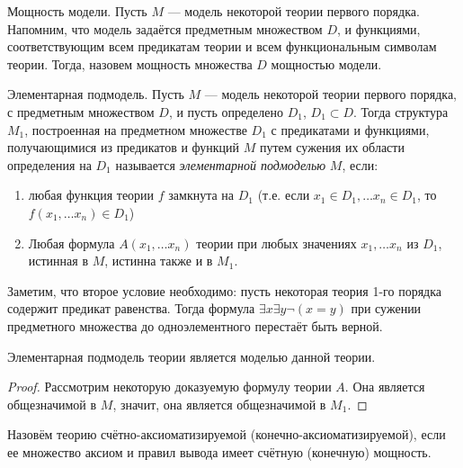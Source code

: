 \begin{definition}{Мощность модели.}
Пусть $M$ --- модель некоторой теории первого порядка. Напомним, что модель
задаётся предметным множеством $D$, и функциями, соответствующим всем
предикатам теории и всем функциональным символам теории. Тогда, назовем
мощность множества $D$ мощностью модели.
\end{definition}

\begin{definition}{Элементарная подмодель.}
Пусть $M$ --- модель некоторой теории первого порядка, с предметным
множеством $D$, и пусть определено $D_1$, $D_1 \subset D$. Тогда
структура $M_1$, построенная на предметном множестве $D_1$ с предикатами
и функциями, получающимися из предикатов и функций $M$ путем сужения 
их области определения на $D_1$ называется \emph{элементарной подмоделью} $M$,
если:
\begin{enumerate}
\item любая функция теории $f$ замкнута на $D_1$ 
(т.е. если $x_1 \in D_1, \dots x_n \in D_1$, то
$f(x_1, \dots x_n) \in D_1$)
\item Любая формула $A(x_1, \dots x_n)$ теории при любых значениях
$x_1, \dots x_n$ из $D_1$, истинная в $M$, истинна также и в $M_1$.
\end{enumerate}
\end{definition}

Заметим, что второе условие необходимо: пусть некоторая теория 1-го 
порядка содержит предикат равенства. Тогда формула
$\exists x \exists y \neg (x = y)$ при сужении предметного множества до
одноэлементного перестаёт быть верной.

\begin{lemma}
Элементарная подмодель теории является моделью данной теории.
\end{lemma}

\begin{proof}
Рассмотрим некоторую доказуемую формулу теории $A$. Она является общезначимой 
в $M$, значит, она является общезначимой в $M_1$. 
\end{proof}

\begin{definition}
Назовём теорию счётно-аксиоматизируемой (конечно-аксио\-ма\-ти\-зи\-руемой), если ее 
множество аксиом и правил вывода имеет счётную (конечную) мощность.
\end{definition}

